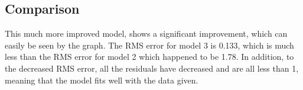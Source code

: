 \subsection{Comparison}
This much more improved model, shows a significant improvement, which can easily be seen by the graph. The RMS error for model 3 is 0.133, which is much less than the RMS error for model 2 which happened to be 1.78. In addition, to the decreased RMS error, all the residuals have decreased and are all less than 1, meaning that the model fits well with the data given.